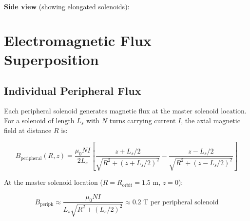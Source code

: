\documentclass[12pt,a4paper]{article}
\begin{document}
\textbf{Side view} (showing elongated solenoids):

\begin{center}
\end{center}

\section{Electromagnetic Flux Superposition}

\subsection{Individual Peripheral Flux}

Each peripheral solenoid generates magnetic flux at the master solenoid location. For a solenoid of length $L_s$ with $N$ turns carrying current $I$, the axial magnetic field at distance $R$ is:

\begin{equation}
B_{\text{peripheral}}(R, z) = \frac{\mu_0 N I}{2 L_s} \left[\frac{z + L_s/2}{\sqrt{R^2 + (z + L_s/2)^2}} - \frac{z - L_s/2}{\sqrt{R^2 + (z - L_s/2)^2}}\right]
\end{equation}

At the master solenoid location ($R = R_{\text{orbit}} = 1.5$ m, $z = 0$):

\begin{equation}
B_{\text{periph}} \approx \frac{\mu_0 N I}{L_s \sqrt{R^2 + (L_s/2)^2}} \approx 0.2 \text{ T per peripheral solenoid}
\end{equation}
\end{document}
